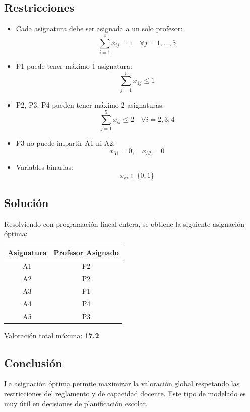 \documentclass[12pt, a4paper, oneside]{book}
\theoremstyle{definition}
\begin{document}
\subsection{Restricciones}

\begin{itemize}
  \item Cada asignatura debe ser asignada a un solo profesor:
  \[
  \sum_{i=1}^4 x_{ij} = 1 \quad \forall j = 1,\ldots,5
  \]

  \item P1 puede tener máximo 1 asignatura:
  \[
  \sum_{j=1}^5 x_{1j} \leq 1
  \]

  \item P2, P3, P4 pueden tener máximo 2 asignaturas:
  \[
  \sum_{j=1}^5 x_{ij} \leq 2 \quad \forall i = 2,3,4
  \]

  \item P3 no puede impartir A1 ni A2:
  \[
  x_{31} = 0, \quad x_{32} = 0
  \]

  \item Variables binarias:
  \[
  x_{ij} \in \{0,1\}
  \]
\end{itemize}

\subsection{Solución}

Resolviendo con programación lineal entera, se obtiene la siguiente asignación óptima:

\begin{center}
\begin{tabular}{cc}
\toprule
Asignatura & Profesor Asignado \\
\midrule
A1 & P2 \\
A2 & P2 \\
A3 & P1 \\
A4 & P4 \\
A5 & P3 \\
\bottomrule
\end{tabular}
\end{center}

Valoración total máxima: \textbf{17.2}

\subsection{Conclusión}

La asignación óptima permite maximizar la valoración global respetando las restricciones del reglamento y de capacidad docente. Este tipo de modelado es muy útil en decisiones de planificación escolar.
\end{document}
